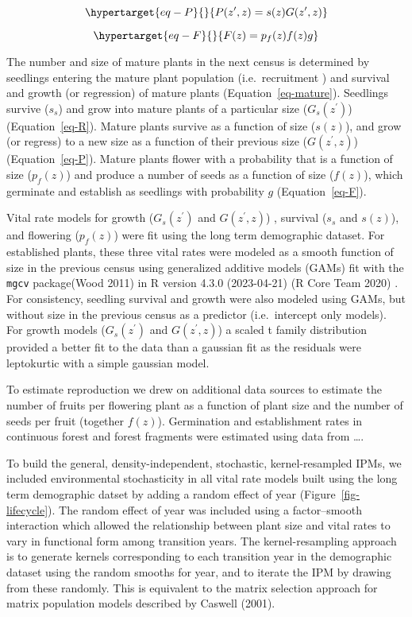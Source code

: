 \documentclass[
  12pt,
]{article}
\begin{document}
\begin{equation}\protect\hypertarget{eq-P}{}{
P(z^\prime, z) = s(z)G(z^\prime, z)
}\label{eq-P}\end{equation}

\begin{equation}\protect\hypertarget{eq-F}{}{
F(z) = p_f(z)f(z)g
}\label{eq-F}\end{equation}

The number and size of mature plants in the next census is determined by
seedlings entering the mature plant population (i.e.~recruitment ) and
survival and growth (or regression) of mature plants
(Equation~\ref{eq-mature}). Seedlings survive (\(s_s\)) and grow into
mature plants of a particular size (\(G_s(z^\prime)\))
(Equation~\ref{eq-R}). Mature plants survive as a function of size
(\(s(z)\)), and grow (or regress) to a new size as a function of their
previous size (\(G(z^\prime, z)\)) (Equation~\ref{eq-P}). Mature plants
flower with a probability that is a function of size (\(p_f(z)\)) and
produce a number of seeds as a function of size (\(f(z)\)), which
germinate and establish as seedlings with probability \(g\)
(Equation~\ref{eq-F}).

Vital rate models for growth (\(G_s(z^\prime)\) and \(G(z^\prime, z)\))
, survival (\(s_s\) and \(s(z)\)), and flowering (\(p_f(z)\)) were fit
using the long term demographic dataset. For established plants, these
three vital rates were modeled as a smooth function of size in the
previous census using generalized additive models (GAMs) fit with the
\texttt{mgcv} package(Wood 2011) in R version 4.3.0 (2023-04-21) (R Core
Team 2020) . For consistency, seedling survival and growth were also
modeled using GAMs, but without size in the previous census as a
predictor (i.e.~intercept only models). For growth models
(\(G_s(z^\prime)\) and \(G(z^\prime, z)\)) a scaled t family
distribution provided a better fit to the data than a gaussian fit as
the residuals were leptokurtic with a simple gaussian model.

To estimate reproduction we drew on additional data sources to estimate
the number of fruits per flowering plant as a function of plant size and
the number of seeds per fruit (together \(f(z)\)). Germination and
establishment rates in continuous forest and forest fragments were
estimated using data from \ldots.

To build the general, density-independent, stochastic, kernel-resampled
IPMs, we included environmental stochasticity in all vital rate models
built using the long term demographic datset by adding a random effect
of year (Figure~\ref{fig-lifecycle}). The random effect of year was
included using a factor--smooth interaction which allowed the
relationship between plant size and vital rates to vary in functional
form among transition years. The kernel-resampling approach is to
generate kernels corresponding to each transition year in the
demographic dataset using the random smooths for year, and to iterate
the IPM by drawing from these randomly. This is equivalent to the matrix
selection approach for matrix population models described by Caswell
(2001).
\end{document}
